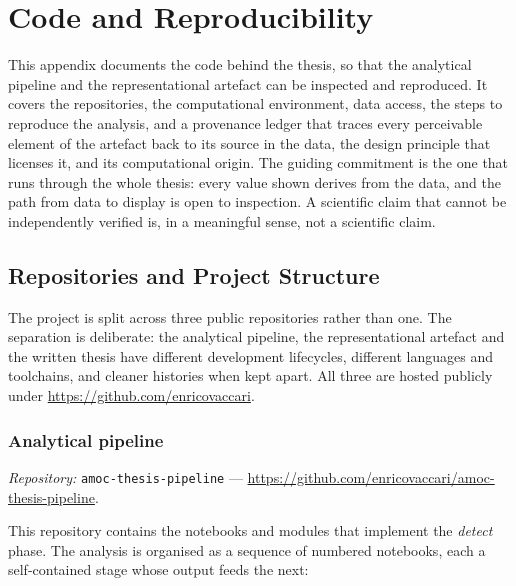 
\chapter{Code and Reproducibility}
\label{app:code}

This appendix documents the code behind the thesis, so that the analytical pipeline and the
representational artefact can be inspected and reproduced. It covers the repositories, the
computational environment, data access, the steps to reproduce the analysis, and a provenance
ledger that traces every perceivable element of the artefact back to its source in the data,
the design principle that licenses it, and its computational origin. The guiding commitment
is the one that runs through the whole thesis: every value shown derives from the data, and
the path from data to display is open to inspection. A scientific claim that cannot be
independently verified is, in a meaningful sense, not a scientific claim.

\section{Repositories and Project Structure}
\label{app:c-repos}

The project is split across three public repositories rather than one. The separation is
deliberate: the analytical pipeline, the representational artefact and the written thesis have
different development lifecycles, different languages and toolchains, and cleaner histories
when kept apart. All three are hosted publicly under \url{https://github.com/enricovaccari}.

\subsection*{Analytical pipeline}
\textit{Repository:} \texttt{amoc-thesis-pipeline} ---
\url{https://github.com/enricovaccari/amoc-thesis-pipeline}.

This repository contains the notebooks and modules that implement the \emph{detect} phase.
The analysis is organised as a sequence of numbered notebooks, each a self-contained stage
whose output feeds the next:


